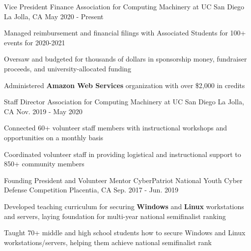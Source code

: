 
\begin{cventries}

  \cventry
    {Vice President Finance} %
    {Association for Computing Machinery at UC San Diego} %
    {La Jolla, CA} %
    {May 2020 - Present} %
    {
      \begin{cvitems} %
        \item {Managed reimbursement and financial filings with Associated Students for 100+ events for 2020-2021}
        \item {Oversaw and budgeted for thousands of dollars in sponsorship money, fundraiser proceeds, and university-allocated funding}
        \item {Administered \textbf{Amazon Web Services} organization with over \$2,000 in credits}
      \end{cvitems}
    }

\cventry
{Staff Director} %
{Association for Computing Machinery at UC San Diego} %
{La Jolla, CA} %
{Nov. 2019 - May 2020} %
{
  \begin{cvitems} %
    \item {Connected 60+ volunteer staff members with instructional workshops and opportunities on a monthly basis}
    \item {Coordinated volunteer staff in providing logistical and instructional support to 850+ community members}
  \end{cvitems}
}

  \cventry
    {Founding President and Volunteer Mentor} %
    {CyberPatriot National Youth Cyber Defense Competition} %
    {Placentia, CA} %
    {Sep. 2017 - Jun. 2019} %
    {
      \begin{cvitems} %
        \item {Developed teaching curriculum for securing \textbf{Windows} and \textbf{Linux} workstations and servers, laying foundation for multi-year national semifinalist ranking}
        \item {Taught 70+ middle and high school students how to secure Windows and Linux workstations/servers, helping them achieve national semifinalist rank}
      \end{cvitems}
    }

\end{cventries}
